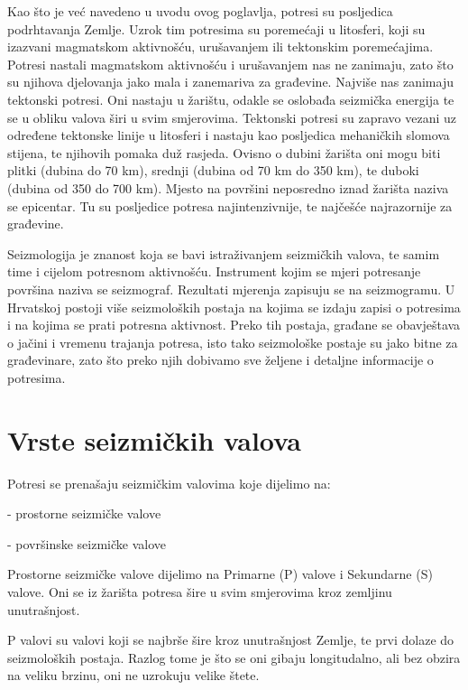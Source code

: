 \documentclass[12pt]{book}
\begin{document}
Kao što je već navedeno u uvodu ovog poglavlja, potresi su posljedica podrhtavanja Zemlje.  Uzrok tim potresima su poremećaji u litosferi, koji su izazvani magmatskom aktivnošću, urušavanjem ili tektonskim poremećajima. Potresi nastali magmatskom aktivnošću i urušavanjem nas ne zanimaju, zato što su njihova djelovanja jako mala i zanemariva za građevine. Najviše nas zanimaju tektonski potresi. Oni nastaju u žarištu, odakle se oslobađa seizmička energija te se u obliku valova širi u svim smjerovima. Tektonski potresi su zapravo vezani uz određene tektonske linije u litosferi i nastaju kao posljedica mehaničkih slomova stijena, te njihovih pomaka duž rasjeda. Ovisno o dubini žarišta oni mogu biti plitki (dubina do 70 km), srednji (dubina od 70 km do 350 km), te duboki (dubina od 350 do 700 km). Mjesto na površini neposredno iznad žarišta naziva se epicentar. Tu su posljedice potresa najintenzivnije, te najčešće najrazornije za građevine. 

Seizmologija je znanost koja se bavi istraživanjem seizmičkih valova, te samim time i cijelom potresnom aktivnošću. Instrument kojim se mjeri potresanje površina naziva se seizmograf. Rezultati mjerenja zapisuju se na seizmogramu. U Hrvatskoj postoji više seizmoloških postaja na kojima se izdaju zapisi o potresima i na kojima se prati potresna aktivnost. Preko tih postaja, građane se obavještava o jačini i vremenu trajanja potresa, isto tako seizmološke postaje su jako bitne za građevinare, zato što preko njih dobivamo sve željene i detaljne informacije o potresima. \cite{herak1984} \cite{oluic2015} \cite{jagodnik_potresi}

\section{Vrste seizmičkih valova}

Potresi se prenašaju seizmičkim valovima koje dijelimo na:

- prostorne seizmičke valove

- površinske seizmičke valove

Prostorne seizmičke valove dijelimo na Primarne (P) valove i Sekundarne (S) valove. Oni se iz žarišta potresa šire u svim smjerovima kroz zemljinu unutrašnjost. 

P valovi su valovi koji se najbrše šire kroz unutrašnjost Zemlje, te prvi dolaze do seizmoloških postaja. Razlog tome je što se oni gibaju longitudalno, ali bez obzira na veliku brzinu, oni ne uzrokuju velike štete. 
\end{document}
